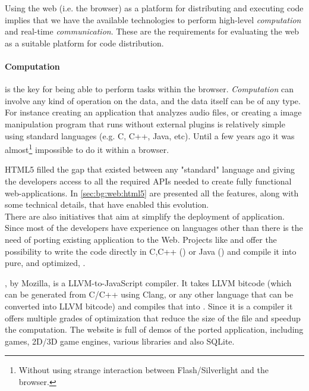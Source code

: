 
Using the web (i.e. the browser) as a platform for distributing and executing
code implies that we have the available technologies to perform high-level
\emph{computation} and real-time \emph{communication}. These are the requirements
for evaluating the web as a suitable platform for code distribution.\\

\paragraph{Computation} is the key for being able to perform tasks within the
browser. \emph{Computation} can involve any kind of operation on the data, and
the data itself can be of any type. For instance creating an application that
analyzes audio files, or creating a image manipulation program that runs without
external plugins is relatively simple using standard languages (e.g. C, C++,
Java, etc). Until a few years ago it was almost\footnote{Without using strange
interaction between Flash/Silverlight and the browser.} impossible to do it within
a browser.

HTML5 filled the gap that existed between any "standard" language and \js{}
giving the developers access to all the required APIs needed to create fully
functional web-applications. In \ref{sec:bg:web:html5} are presented all the
features, along with some technical details, that have enabled this evolution.\\

There are also initiatives that aim at simplify the deployment of \js{}
application. Since most of the developers have experience on languages other than
\js{} there is the need of porting existing application to the Web.
Projects like  and 
offer the possibility to write the code directly in C,C++ ()
or Java () and compile it into pure, and optimized, \js{}.

, by Mozilla, is a LLVM-to-JavaScript compiler. It takes
LLVM bitcode (which can be generated from C/C++ using Clang, or any other
language that can be converted into LLVM bitcode) and compiles that into \js{}.
Since it is a compiler it offers multiple grades of optimization that reduce the
size of the \js{} file and speedup the computation. The website is full of demos
of the ported application, including games, 2D/3D game engines, various libraries
and also SQLite.

